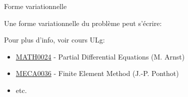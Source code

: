 \documentclass[
mode=present,    %
paper=a4paper,   %
orient=landscape,
display=slides,   %
size=10pt,     %
style=romain   %
]{powerdot}
\begin{document}
\begin{slide}[toc=]{Forme variationnelle}

Une forme variationnelle du problème peut s'écrire:

\bigskip

\noindent{} %


Pour plus d'info, voir cours ULg:
\begin{itemize}
\item \href{http://progcours.ulg.ac.be/cocoon/cours/MATH0024-1.html}{MATH0024} - Partial Differential Equations (M. Arnst)
\item \href{http://progcours.ulg.ac.be/cocoon/cours/MECA0036-1.html}{MECA0036} - Finite Element Method (J.-P. Ponthot)
\item etc.
\end{itemize}

\end{slide}
\end{document}

